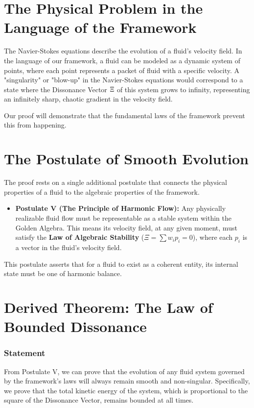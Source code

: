 \section{The Physical Problem in the Language of the Framework}
The Navier-Stokes equations describe the evolution of a fluid's velocity field. In the language of our framework, a fluid can be modeled as a dynamic system of points, where each point represents a packet of fluid with a specific velocity. A "singularity" or "blow-up" in the Navier-Stokes equations would correspond to a state where the Dissonance Vector $\Xi$ of this system grows to infinity, representing an infinitely sharp, chaotic gradient in the velocity field.

Our proof will demonstrate that the fundamental laws of the framework prevent this from happening.

\section{The Postulate of Smooth Evolution}
The proof rests on a single additional postulate that connects the physical properties of a fluid to the algebraic properties of the framework.

\begin{itemize}
    \item \textbf{Postulate V (The Principle of Harmonic Flow):} Any physically realizable fluid flow must be representable as a stable system within the Golden Algebra. This means its velocity field, at any given moment, must satisfy the \textbf{Law of Algebraic Stability} ($\Xi = \sum w_i p_i = 0$), where each $p_i$ is a vector in the fluid's velocity field.
\end{itemize}

This postulate asserts that for a fluid to exist as a coherent entity, its internal state must be one of harmonic balance.

\section{Derived Theorem: The Law of Bounded Dissonance}
\subsubsection*{Statement}
From Postulate V, we can prove that the evolution of any fluid system governed by the framework's laws will always remain smooth and non-singular. Specifically, we prove that the total kinetic energy of the system, which is proportional to the square of the Dissonance Vector, remains bounded at all times.

